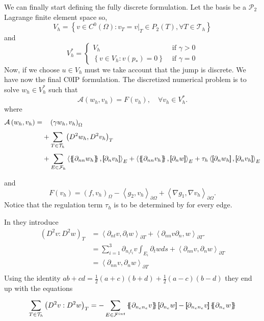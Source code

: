 We can finally start defining the fully discrete formulation. Let the basis be a $\mathcal{P}_{2} $ Lagrange finite element space so,
\[
V_{h} = \left\{ v \in C^{0}\left( \Omega  \right): v_{T} = v | _{T} \in P_{2}\left( T \right), \forall T \in
\mathcal{T}_{h}    \right\}
\]
and
\[
V_{h}^{*} = \begin{cases}
    V_{h} & \text{ if } \gamma > 0 \\
    \left\{ v \in V_{h}: v\left( p_{*}  \right) = 0   \right\} &  \text{ if } \gamma  = 0
\end{cases}
\]
Now, if we choose $u \in V_{h}$ must we take account that the jump is discrete.
 We have now the final C0IP formulation.
The discretized numerical problem is to solve $w_{h} \in V_{h}^{*}$ such that \[
\mathcal{A}\left( w_{h}, v_{h} \right)   = F\left( v_{h} \right), \quad \forall v_{h} \in V_{h}^{*}  .
\]
where
\begin{equation}
\label{eq:basic_dg_A_h}
\begin{split}
\mathcal{A} \left( w_{h}, v_{h} \right)   =&
  \quad  \left( \gamma w_{h}, v_{h} \right) _{\Omega }\\
&  + \sum_{T \in \mathcal{T} _{h}}^{} \left( D^2 w_{h}, D^2v_{h} \right) _{T} \\
 & +
  \sum_{E \in \mathcal{F}_{h} }^{}
  \left< \mean{  \partial _{n n} w_{h} }, \jump{ \partial _{n }v_{h}} \right>_{E}  +
 \left< \mean{ \partial _{n n} v_{h} }, \jump{ \partial _{n}w }      \right>_{E}
+ \tau _{h} \left< \jump{ \partial _{n} w_{h}}, \jump{ \partial _{n} v_{h}   }   \right>_{E}
\end{split}
\end{equation}

and
\begin{equation}
\label{eq:basic_dg_F_h}
F\left( v_{h} \right)  = \left( f, v_{h} \right) _{\Omega } - \left<g_{2},v_{h} \right>_{\partial \Omega } + \left<\nabla g_{1}, \nabla v_{h} \right>_{\partial \Omega }.
\end{equation}
Notice that the regulation term $\tau _{h}$ is to be determined by for every edge.

In \cite{gu2012c0} they introduce \[
            \begin{split}
    \left( D^2v: D^2w \right)_{T } & = \left<\partial _{nt} v , \partial _{t} w  \right>_{\partial T} + \left< \partial
    _{nn} v
    \partial _{n}, w \right>_{\partial T}. \\
    &= \sum_{i=1}^{3} \partial _{n_{i} t_{i}} v \int_{E_{i}}^{} \partial _{t} w ds +\left< \partial
    _{nn} v,
    \partial _{n} w \right>_{\partial T}     \\
    &=\left< \partial
    _{nn} v,
    \partial _{n} w \right>_{\partial T}  \\
            \end{split}
    \]
    Using the identity $ab +cd = \frac{1}{2} (a+c)(b+d) + \frac{1}{2}(a-c)(b-d) $  they end up with the equations  \[
    \sum_{T \in \mathcal{T}_{h}  }^{} \left( D^2v: D^2w \right)_{T }  =
    - \sum_{E \in \mathcal{F} ^{int}}^{}  \mean{ \partial _{n_e n_{e}} v  } \jump{ \partial _{n_{e}} w } - \jump{
    \partial _{n_e n_{e}} v}  \mean{ \partial _{n_{e}} w }
\]

